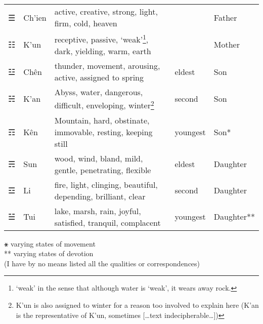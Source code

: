 \documentclass[11pt]{book}
\begin{document}
\begin{longtable}[]{@{}
  >{\raggedleft\arraybackslash}p{}
  >{\centering\arraybackslash}p{}
  >{\raggedright\arraybackslash}p{}
  >{\raggedright\arraybackslash}p{}
  >{\raggedleft\arraybackslash}p{}@{}}
\toprule
\endhead
☰ & Ch'ien & active, creative, strong, light, firm, cold, heaven & & Father \\
☷ & K'un & receptive, passive, `weak'\footnote{`weak' in the sense that although water is `weak', it wears away rock.}, dark, yielding, warm, earth & & Mother \\
☳ & Chên & thunder, movement, arousing, active, assigned to spring & eldest & Son \\
☵ & K'an & Abyss, water, dangerous, difficult, enveloping, winter\footnote{K'un is also assigned to winter for a reason too involved to explain here (K'an is the representative of K'un, sometimes {[}\ldots text indecipherable\ldots{]})} & second & Son \\
☶ & Kên & Mountain, hard, obstinate, immovable, resting, keeping still & youngest & Son* \\
☴ & Sun & wood, wind, bland, mild, gentle, penetrating, flexible & eldest & Daughter \\
☲ & Li & fire, light, clinging, beautiful, depending, brilliant, clear & second & Daughter \\
☱ & Tui & lake, marsh, rain, joyful, satisfied, tranquil, complacent & youngest & Daughter** \\
\bottomrule
\end{longtable}

⚹ varying states of movement\\
** varying states of devotion\\
(I have by no means listed all the qualities or correspondences)
\end{document}

